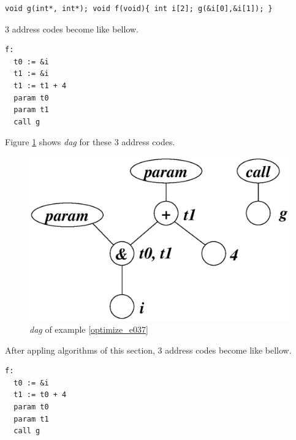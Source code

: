 \begin{Example}
\label{optimize_e037}
\begin{verbatim}
void g(int*, int*); void f(void){ int i[2]; g(&i[0],&i[1]); }
\end{verbatim}
3 address codes become like bellow.
\begin{verbatim}
f:
  t0 := &i
  t1 := &i
  t1 := t1 + 4
  param t0
  param t1
  call g
\end{verbatim}
Figure \ref{optimize_e038} shows {\em dag} for these 3 address codes.
\begin{figure}[htbp]
\begin{center}
\includegraphics[width=1.0\linewidth,height=0.623\linewidth]{opt020.eps}
\caption{{\em dag} of example \ref{optimize_e037}}
\label{optimize_e038}
\end{center}
\end{figure}
After appling algorithms of this section,
3 address codes become like bellow.
\begin{verbatim}
f:
  t0 := &i
  t1 := t0 + 4
  param t0
  param t1
  call g
\end{verbatim}
\end{Example}

